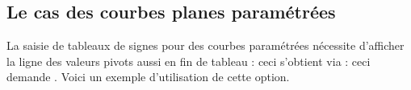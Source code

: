 \documentclass[10pt, a4paper]{tutodoc}
\begin{document}

\subsection{Le cas des courbes planes paramétrées}

La saisie de tableaux de signes pour des courbes paramétrées nécessite d'afficher la ligne des valeurs pivots aussi en fin de tableau : ceci s'obtient via  : ceci demande . Voici un exemple d'utilisation de cette option. 
\end{document}
